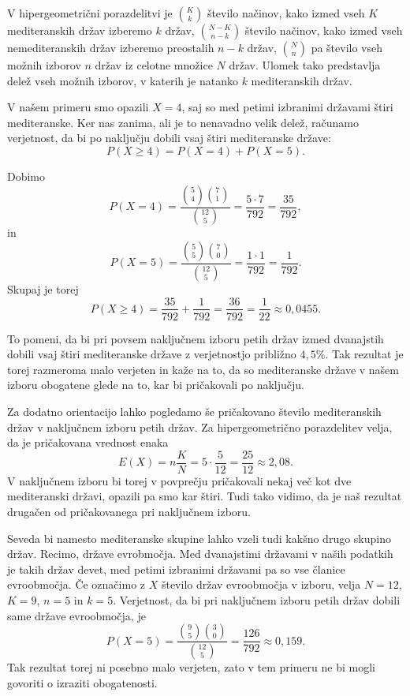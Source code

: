 V hipergeometrični porazdelitvi je \(\binom{K}{k}\) število načinov, kako izmed vseh \(K\) mediteranskih držav izberemo \(k\) držav, \(\binom{N-K}{n-k}\) število načinov, kako izmed vseh nemediteranskih držav izberemo preostalih \(n-k\) držav, \(\binom{N}{n}\) pa število vseh možnih izborov \(n\) držav iz celotne množice \(N\) držav. Ulomek tako predstavlja delež vseh možnih izborov, v katerih je natanko \(k\) mediteranskih držav.

V našem primeru smo opazili \(X=4\), saj so med petimi izbranimi državami štiri mediteranske. Ker nas zanima, ali je to nenavadno velik delež, računamo verjetnost, da bi po naključju dobili vsaj štiri mediteranske države:
\[
P(X\ge 4)=P(X=4)+P(X=5).
\]

Dobimo
\[
P(X=4)=\frac{\binom{5}{4}\binom{7}{1}}{\binom{12}{5}}
=\frac{5\cdot 7}{792}
=\frac{35}{792},
\]
in
\[
P(X=5)=\frac{\binom{5}{5}\binom{7}{0}}{\binom{12}{5}}
=\frac{1\cdot 1}{792}
=\frac{1}{792}.
\]
Skupaj je torej
\[
P(X\ge 4)=\frac{35}{792}+\frac{1}{792}
=\frac{36}{792}
=\frac{1}{22}
\approx 0{,}0455.
\]

To pomeni, da bi pri povsem naključnem izboru petih držav izmed dvanajstih dobili vsaj štiri mediteranske države z verjetnostjo približno \(4{,}5\%\). Tak rezultat je torej razmeroma malo verjeten in kaže na to, da so mediteranske države v našem izboru obogatene glede na to, kar bi pričakovali po naključju.

Za dodatno orientacijo lahko pogledamo še pričakovano število mediteranskih držav v naključnem izboru petih držav. Za hipergeometrično porazdelitev velja, da je pričakovana vrednost enaka
\[
E(X)=n\frac{K}{N}=5\cdot\frac{5}{12}=\frac{25}{12}\approx 2{,}08.
\]
V naključnem izboru bi torej v povprečju pričakovali nekaj več kot dve mediteranski državi, opazili pa smo kar štiri. Tudi tako vidimo, da je naš rezultat drugačen od pričakovanega pri naključnem izboru.

Seveda bi namesto mediteranske skupine lahko vzeli tudi kakšno drugo skupino držav. Recimo, države evrobmočja. Med dvanajstimi državami v naših podatkih je takih držav devet, med petimi izbranimi državami pa so vse članice evroobmočja. Če označimo z \(X\) število držav evroobmočja v izboru, velja \(N=12\), \(K=9\), \(n=5\) in \(k=5\). Verjetnost, da bi pri naključnem izboru petih držav dobili same države evroobmočja, je
\[
P(X=5)=\frac{\binom{9}{5}\binom{3}{0}}{\binom{12}{5}}
=\frac{126}{792}
\approx 0{,}159.
\]
Tak rezultat torej ni posebno malo verjeten, zato v tem primeru ne bi mogli govoriti o izraziti obogatenosti.

